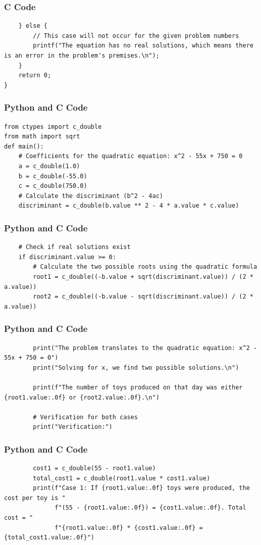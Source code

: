 \documentclass{beamer}
\begin{document}
\begin{frame}[fragile]
\frametitle{C Code}
\begin{lstlisting}
    } else {
        // This case will not occur for the given problem numbers
        printf("The equation has no real solutions, which means there is an error in the problem's premises.\n");
    }
    return 0;
}
\end{lstlisting}
\end{frame}

\begin{frame}[fragile]
\frametitle{Python and C Code}
\begin{lstlisting}
from ctypes import c_double
from math import sqrt
def main():
    # Coefficients for the quadratic equation: x^2 - 55x + 750 = 0
    a = c_double(1.0)
    b = c_double(-55.0)
    c = c_double(750.0)
    # Calculate the discriminant (b^2 - 4ac)
    discriminant = c_double(b.value ** 2 - 4 * a.value * c.value)
\end{lstlisting}
\end{frame}

\begin{frame}[fragile]
\frametitle{Python and C Code}
\begin{lstlisting}
    # Check if real solutions exist
    if discriminant.value >= 0:
        # Calculate the two possible roots using the quadratic formula
        root1 = c_double((-b.value + sqrt(discriminant.value)) / (2 * a.value))
        root2 = c_double((-b.value - sqrt(discriminant.value)) / (2 * a.value))
\end{lstlisting}
\end{frame}

\begin{frame}[fragile]
\frametitle{Python and C Code}
\begin{lstlisting}
        print("The problem translates to the quadratic equation: x^2 - 55x + 750 = 0")
        print("Solving for x, we find two possible solutions.\n")

        print(f"The number of toys produced on that day was either {root1.value:.0f} or {root2.value:.0f}.\n")

        # Verification for both cases
        print("Verification:")
\end{lstlisting}
\end{frame}

\begin{frame}[fragile]
\frametitle{Python and C Code}
\begin{lstlisting}
        cost1 = c_double(55 - root1.value)
        total_cost1 = c_double(root1.value * cost1.value)
        print(f"Case 1: If {root1.value:.0f} toys were produced, the cost per toy is "
              f"(55 - {root1.value:.0f}) = {cost1.value:.0f}. Total cost = "
              f"{root1.value:.0f} * {cost1.value:.0f} = {total_cost1.value:.0f}")
\end{lstlisting}
\end{frame}
\end{document}
